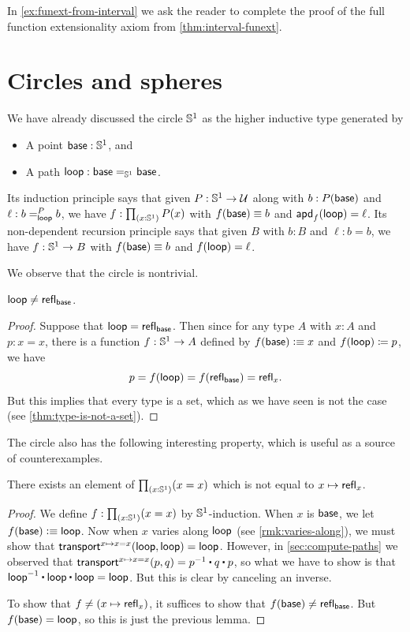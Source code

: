 In \cref{ex:funext-from-interval} we ask the reader to complete the proof of the full function extensionality axiom from \cref{thm:interval-funext}.

%

\section{Circles and spheres}
\label{sec:circle}

%
We have already discussed the circle $\Sn^1$ as the higher inductive type generated by
\begin{itemize}
\item A point $\base:\Sn^1$, and
\item A path $\lloop : {\id[\Sn^1]\base\base}$.
\end{itemize}
%
Its induction principle says that given $P:\Sn^1\to\type$ along with $b:P(\base)$ and $\ell :\dpath P \lloop b b$, we have $f:\prd{x:\Sn^1} P(x)$ with $f(\base)\jdeq b$ and $\apd f \lloop = \ell$.
Its non-dependent recursion principle says that given $B$ with $b:B$ and $\ell:b=b$, we have $f:\Sn^1\to B$ with $f(\base)\jdeq b$ and $\ap f \lloop = \ell$.

We observe that the circle is nontrivial.

\begin{lem}\label{thm:loop-nontrivial}
  $\lloop\neq\refl{\base}$.
\end{lem}
\begin{proof}
  Suppose that $\lloop=\refl{\base}$.
  Then since for any type $A$ with $x:A$ and $p:x=x$, there is a function $f:\Sn^1\to A$ defined by $f(\base)\defeq x$ and $\ap f \lloop \defid p$, we have
  \[p = f(\lloop) = f(\refl{\base}) = \refl{x}.\]
  But this implies that every type is a set, which as we have seen is not the case (see \cref{thm:type-is-not-a-set}).
\end{proof}

The circle also has the following interesting property, which is useful as a source of counterexamples.

\begin{lem}\label{thm:S1-autohtpy}
  There exists an element of $\prd{x:\Sn^1} (x=x)$ which is not equal to $x\mapsto \refl{x}$.
\end{lem}
\begin{proof}
  We define $f:\prd{x:\Sn^1} (x=x)$ by $\Sn^1$-induction.
  When $x$ is $\base$, we let $f(\base)\defeq \lloop$.
  Now when $x$ varies along $\lloop$ (see \cref{rmk:varies-along}), we must show that $\transfib{x\mapsto x=x}{\lloop}{\lloop} = \lloop$.
  However, in \cref{sec:compute-paths} we observed that $\transfib{x\mapsto x=x}{p}{q} = \opp{p} \ct q \ct p$, so what we have to show is that $\opp{\lloop} \ct \lloop \ct \lloop = \lloop$.
  But this is clear by canceling an inverse.

  To show that $f\neq (x\mapsto \refl{x})$, it suffices to show that $f(\base) \neq \refl{\base}$.
  But $f(\base)=\lloop$, so this is just the previous lemma.
\end{proof}

